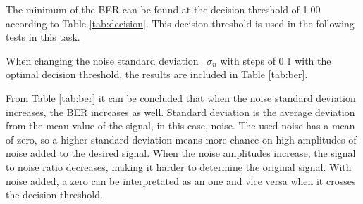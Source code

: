 \documentclass[final]{scrreprt} %
\begin{document}
The minimum of the BER can be found at the decision threshold of 1.00 according to Table \ref{tab:decision}. This decision threshold is used in the following tests in this task.

When changing the noise standard deviation ~$\sigma_n$ with steps of 0.1 with the optimal decision threshold, the results are included in Table \ref{tab:ber}.

From Table \ref{tab:ber} it can be concluded that when the noise standard deviation increases, the BER increases as well. Standard deviation is the average deviation from the mean value of the signal, in this case, noise. The used noise has a mean of zero, so a higher standard deviation means more chance on high amplitudes of noise added to the desired signal. When the noise amplitudes increase, the signal to noise ratio decreases, making it harder to determine the original signal. With noise added, a zero can be interpretated as an one and vice versa when it crosses the decision threshold.
\end{document}
